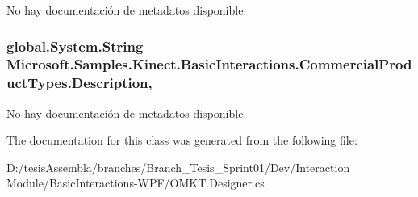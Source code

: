 No hay documentación de metadatos disponible. 

\hypertarget{class_microsoft_1_1_samples_1_1_kinect_1_1_basic_interactions_1_1_commercial_product_types_ada7f0864f2e53e48354d6463fd7ab72b}{
\subsubsection[{Description}]{\setlength{\rightskip}{0pt plus 5cm}global.\-System.\-String Microsoft.\-Samples.\-Kinect.\-Basic\-Interactions.\-Commercial\-Product\-Types.\-Description\hspace{0.3cm}{\ttfamily [get]}, {\ttfamily [set]}}}\label{class_microsoft_1_1_samples_1_1_kinect_1_1_basic_interactions_1_1_commercial_product_types_ada7f0864f2e53e48354d6463fd7ab72b}


No hay documentación de metadatos disponible. 



The documentation for this class was generated from the following file\-:\begin{DoxyCompactItemize}
\item 
D\-:/tesis\-Assembla/branches/\-Branch\-\_\-\-Tesis\-\_\-\-Sprint01/\-Dev/\-Interaction Module/\-Basic\-Interactions-\/\-W\-P\-F/O\-M\-K\-T.\-Designer.\-cs\end{DoxyCompactItemize}
